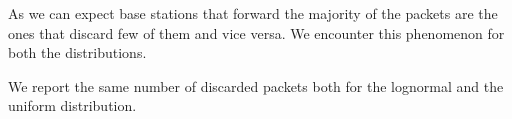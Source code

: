 \documentclass{report}
\begin{document}
As we can expect base stations that forward the majority of the packets are the ones that discard few of them and vice versa. We encounter this phenomenon for both the distributions.

We report the same number of discarded packets both for the lognormal and the uniform distribution.

\appendix
\end{document}
